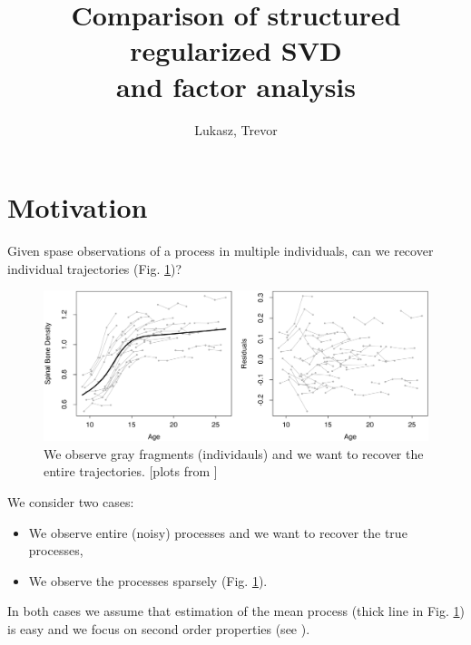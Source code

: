 \documentclass{article}
\title{Comparison of structured regularized SVD\\ and factor analysis}
\author{Lukasz, Trevor}
\begin{document}
\maketitle



\section{Motivation}

Given spase observations of a process in multiple individuals, can we recover individual trajectories (Fig. \ref{fig:motivation})?

\begin{figure}[h]
  \includegraphics[width=\linewidth]{images/motivation}
  \caption{We observe gray fragments (individauls) and we want to recover the entire trajectories. [plots from \citet{james2000principal}]}
  \label{fig:motivation}
\end{figure}

We consider two cases:
\begin{itemize}
  \item We observe entire (noisy) processes and we want to recover the true processes,
  \item We observe the processes sparsely (Fig. \ref{fig:motivation}).
\end{itemize}

In both cases we assume that estimation of the mean process (thick line in Fig. \ref{fig:motivation}) is easy and we focus on second order properties (see \citet{rice1991estimating}).
\end{document}
